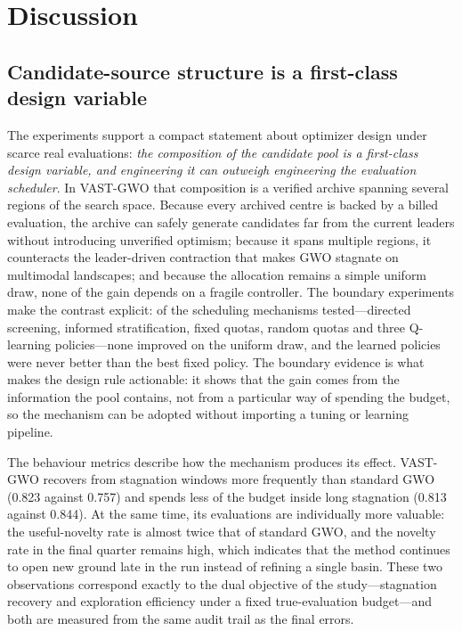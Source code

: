 \documentclass[11pt,a4paper]{article}
\newcommand{\method}{VAST-GWO}
\begin{document}
\section{Discussion}
\label{sec:discussion}
\subsection{Candidate-source structure is a first-class design variable}
The experiments support a compact statement about optimizer design under
scarce real evaluations: \emph{the composition of the candidate pool is a
first-class design variable, and engineering it can outweigh engineering the
evaluation scheduler}. In \method{} that composition is a verified archive
spanning several regions of the search space. Because every archived centre is
backed by a billed evaluation, the archive can safely generate candidates far
from the current leaders without introducing unverified optimism; because it
spans multiple regions, it counteracts the leader-driven contraction that makes
GWO stagnate on multimodal landscapes; and because the allocation remains a
simple uniform draw, none of the gain depends on a fragile controller. The
boundary experiments make the contrast explicit: of the scheduling
mechanisms tested---directed screening, informed stratification, fixed quotas,
random quotas and three Q-learning policies---none improved on the uniform
draw, and the learned policies were never better than the best fixed policy.
The boundary evidence is what makes the design rule actionable: it shows that
the gain comes from the information the pool contains, not from a particular
way of spending the budget, so the mechanism can be adopted without importing a
tuning or learning pipeline.

The behaviour metrics describe how the mechanism produces its effect.
\method{} recovers from stagnation windows more frequently than standard GWO
(0.823 against 0.757) and spends less of the budget inside long stagnation
(0.813 against 0.844). At the same time, its evaluations are individually more
valuable: the useful-novelty rate is almost twice that of standard GWO, and
the novelty rate in the final quarter remains high, which indicates that the
method continues to open new ground late in the run instead of refining a
single basin. These two observations correspond exactly to the dual objective
of the study---stagnation recovery and exploration efficiency under a fixed
true-evaluation budget---and both are measured from the same audit trail as
the final errors.
\end{document}
